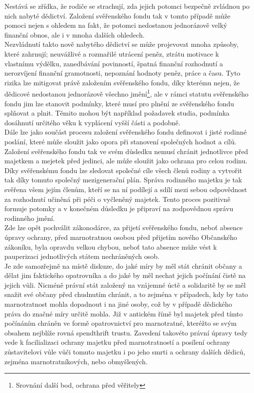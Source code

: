 \documentclass{article}
\begin{document}
 Nestává se zřídka, že rodiče se strachují, zda jejich potomci bezpečně zvládnou po nich nabyté dědictví. Založení svěřenského fondu tak v tomto případě může pomoci nejen s ohledem na fakt, že potomci nedostanou jednorázově velký finanční obnos, ale i v mnoha dalších ohledech.\\
 
 Nezvládnutí takto nově nabytého dědictví se může projevovat mnoha způsoby, které zahrnují; neuvážlivé a rozmařilé utrácení peněz, ztrátu motivace k vlastnímu výdělku, zanedbávání povinností, špatná finanční rozhodnutí a nerozvíjení finanční gramotnosti, nepoznání hodnoty peněz, práce a času. Tyto rizika lze mitigovat právě založením svěřenského fondu, díky kterému nejen, že dědicové nedostanou jednorázově všechno jmění\footnote{Srovnání další bod, ochrana před věřitely}, ale v rámci statutu svěřenského fondu jim lze stanovit podmínky, které musí pro plnění ze svěřenského fondu splňovat a plnit. Těmito mohou být například požadavek studia, podmínka dosáhnutí určitého věku k vyplácení vyšší části a podobně.\\
 
 Dále lze jako součást procesu založení svěřenského fondu definovat i jisté rodinné poslání, které může sloužit jako opora při stanovení společných hodnot a cílů. Založení svěřenského fondu tak ve svém důsledku nemusí chránit jednotlivce před majetkem a mejetek před jedinci, ale může sloužit jako ochrana pro celou rodinu. Díky svěřenskému fondu lze sledovat společné cíle všech členů rodiny a vytvořit tak díky tomuto společný mezigenerační plán. Správa rodinného majetku je tak svěřena všem jejím členům, kteří se na ní podílejí a sdílí mezi sebou odpovědnost za rozhodnutí učiněná při péči o vyčleněn\-ý majetek. Tento proces pozitivně formuje potomky a v konečném důsledku je připraví na zodpovědnou správu rodinného jmění.\\
 
 Zde lze opět pochválit zákonodárce, za přijetí svěřenského fondu, neboť absence úpravy ochrany, před marnotratnou osobou před přijetím nového Občanského zákoníku, byla opravdu velkou chybou, neboť tato absence může vést k pauperizaci jednotlivých státem nechráněných osob.\\
 
 Je zde samozřejmě na místě diskuze, do jaké míry by měl stát chránit občany a dělat jim faktického opatrovníka a do jaké by měl nechat jejich počínání čistě na jejich vůli. Nicméně právní stát založený na vzájemné úctě a solidaritě by se měl snažit své občany před chudnutím chránit, a to zejména v případech, kdy by tato marnotratnost mohla dopadnout i na jiné osoby, což by v případě dědického práva do značné míry určitě mohla. Již v antickém římě byl majetek před tímto počínáním chráněn ve formě opatrovnictví pro marnotratné, kteréžto se svým obsahem nejblíže rovná spendthrift trustu. Zavedení takovéto právní úpravy tedy vede k facilializaci ochrany majetku před marnotratností a posílení ochrany zůstavitelovi vůle vůči tomuto majetku i po jeho smrti a ochrany dalších dědiců, zejména marnotratníkových, nebo obmyšlených.\\
 
\end{document}
